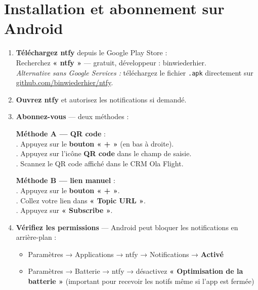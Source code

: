 \documentclass[a4paper, 11pt]{article}
\begin{document}
\section{Installation et abonnement sur Android}

\begin{enumerate}[leftmargin=*, label=\textbf{\arabic*.}]

  \item \textbf{Téléchargez ntfy} depuis le Google Play Store :\\
  Recherchez \textbf{« ntfy »} — gratuit, développeur : binwiederhier.\\[0.3em]
  \textit{Alternative sans Google Services :} téléchargez le fichier \texttt{.apk}
  directement sur \href{https://github.com/binwiederhier/ntfy/releases}{github.com/binwiederhier/ntfy}.

  \item \textbf{Ouvrez ntfy} et autorisez les notifications si demandé.

  \item \textbf{Abonnez-vous} — deux méthodes :

  \begin{stepbox}
  \textbf{Méthode A — QR code} :\\[0.5em]
  . Appuyez sur le \textbf{bouton « + »} (en bas à droite).\\
  . Appuyez sur l'icône \textbf{QR code} dans le champ de saisie.\\
  . Scannez le QR code affiché dans le CRM Ola Flight.
  \end{stepbox}

  \begin{stepbox}
  \textbf{Méthode B — lien manuel} :\\[0.5em]
  . Appuyez sur le \textbf{bouton « + »}.\\
  . Collez votre lien dans \textbf{« Topic URL »}.\\
  . Appuyez sur \textbf{« Subscribe »}.
  \end{stepbox}

  \item \textbf{Vérifiez les permissions} — Android peut bloquer les notifications
  en arrière-plan :
  \begin{itemize}[leftmargin=2em]
    \item Paramètres → Applications → ntfy → Notifications → \textbf{Activé}
    \item Paramètres → Batterie → ntfy → désactivez \textbf{« Optimisation de la batterie »}
    (important pour recevoir les notifs même si l'app est fermée)
  \end{itemize}

\end{enumerate}
\end{document}
